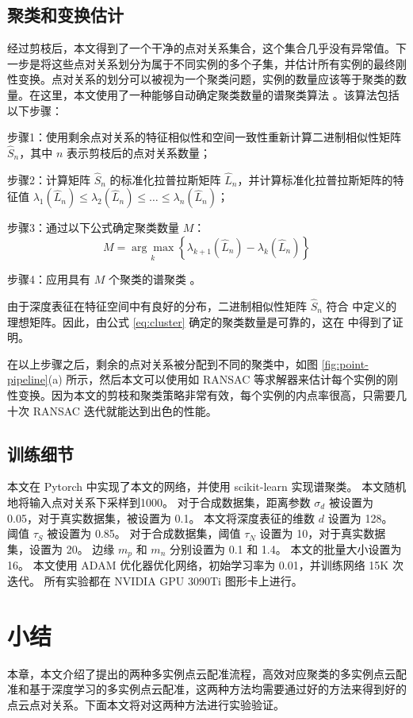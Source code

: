 \subsection{聚类和变换估计}\label{sec:clusterandtransform}
经过剪枝后，本文得到了一个干净的点对关系集合，这个集合几乎没有异常值。下一步是将这些点对关系划分为属于不同实例的多个子集，并估计所有实例的最终刚性变换。点对关系的划分可以被视为一个聚类问题，实例的数量应该等于聚类的数量。在这里，本文使用了一种能够自动确定聚类数量的谱聚类算法 \cite{von2007tutorial,li2007noise}。该算法包括以下步骤：

步骤1：使用剩余点对关系的特征相似性和空间一致性重新计算二进制相似性矩阵 $\hat{S}_n$，其中 $n$ 表示剪枝后的点对关系数量；

步骤2：计算矩阵 $\hat{S}_n$ 的标准化拉普拉斯矩阵 $\hat{L}_n$，并计算标准化拉普拉斯矩阵的特征值 $\lambda_{1}\left(\hat{L}_{n}\right) \leq \lambda_{2}\left(\hat{L}_{n}\right) \leq \ldots \leq \lambda_{n}\left(\hat{L}_{n}\right)$；

步骤3：通过以下公式确定聚类数量 $M$：
\begin{equation}
  \label{eq:cluster}
  M=\underset{k}{\arg \max }\left\{\lambda_{k+1}\left(\hat{L}_{n}\right)-\lambda_{k}\left(\hat{L}_{n}\right)\right\}
\end{equation}

步骤4：应用具有 $M$ 个聚类的谱聚类 \cite{von2007tutorial} 。

由于深度表征在特征空间中有良好的分布，二进制相似性矩阵 $\hat{S}_n$ 符合 \cite{li2007noise} 中定义的理想矩阵。因此，由公式 \ref{eq:cluster} 确定的聚类数量是可靠的，这在 \cite{li2007noise} 中得到了证明。

在以上步骤之后，剩余的点对关系被分配到不同的聚类中，如图 \ref{fig:point-pipeline}(a) 所示，然后本文可以使用如 RANSAC \cite{fischler1981random} 等求解器来估计每个实例的刚性变换。因为本文的剪枝和聚类策略非常有效，每个实例的内点率很高，只需要几十次 RANSAC 迭代就能达到出色的性能。

\subsection{训练细节}
本文在 Pytorch 中实现了本文的网络，并使用 scikit-learn \cite{Pedregosa2011Scikit} 实现谱聚类。
本文随机地将输入点对关系下采样到1000。
对于合成数据集，距离参数 $\sigma_d$ 被设置为 0.05，对于真实数据集，被设置为 0.1。
本文将深度表征的维数 $d$ 设置为 128。
阈值 $\tau_S$ 被设置为 0.85。
对于合成数据集，阈值 $\tau_N$ 设置为 10，对于真实数据集，设置为 20。
边缘 $m_p$ 和 $m_n$ 分别设置为 0.1 和 1.4。
本文的批量大小设置为 16。
本文使用 ADAM 优化器优化网络，初始学习率为 0.01，并训练网络 15K 次迭代。
所有实验都在 NVIDIA GPU 3090Ti 图形卡上进行。

\section{小结}
本章，本文介绍了提出的两种多实例点云配准流程，高效对应聚类的多实例点云配准和基于深度学习的多实例点云配准，这两种方法均需要通过好的方法来得到好的点云点对关系。下面本文将对这两种方法进行实验验证。